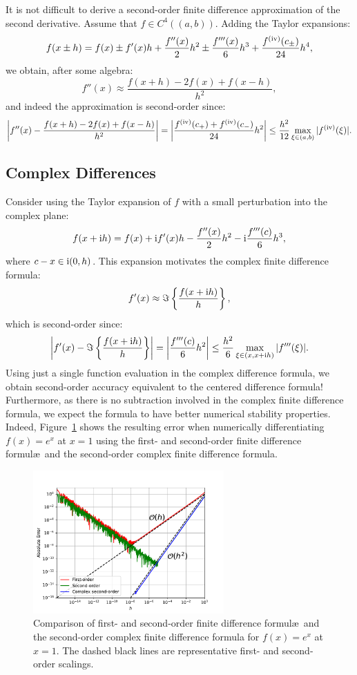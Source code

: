 It is not difficult to derive a second-order finite difference approximation of the second derivative. Assume that $f\in C^4((a,b))$. Adding the Taylor expansions:
\[
f(x\pm h) = f(x) \pm f'(x)h + \dfrac{f''(x)}{2}h^2 \pm \dfrac{f'''(x)}{6}h^3 + \dfrac{f^{({\rm iv})}(c_\pm)}{24}h^4,
\]
we obtain, after some algebra:
\[
f''(x) \approx \dfrac{f(x+h)-2f(x) + f(x-h)}{h^2},
\]
and indeed the approximation is second-order since:
\[
\left|f''(x) - \dfrac{f(x+h)-2f(x) + f(x-h)}{h^2}\right| = \left|\dfrac{f^{({\rm iv})}(c_+) + f^{({\rm iv})}(c_-)}{24}h^2\right| \le \dfrac{h^2}{12}\max_{\xi\in(a,b)}|f^{({\rm iv})}(\xi)|.
\]

\subsection{Complex Differences}

Consider using the Taylor expansion of $f$ with a small perturbation into the complex plane:
\[
f(x+{\rm i} h) = f(x) + {\rm i} f'(x)h - \dfrac{f''(x)}{2}h^2 - {\rm i}\dfrac{f'''(c)}{6}h^3,
\]
where $c-x\in{\rm i}(0,h)$. This expansion motivates the complex finite difference formula:
\[
f'(x) \approx \Im\left\{\dfrac{f(x+{\rm i} h)}{h}\right\},
\]
which is second-order since:
\[
\left|f'(x) - \Im\left\{\dfrac{f(x+{\rm i} h)}{h}\right\}\right| = \left|\dfrac{f'''(c)}{6}h^2\right| \le \dfrac{h^2}{6}\max_{\xi\in(x,x+{\rm i} h)}|f'''(\xi)|.
\]
Using just a single function evaluation in the complex difference formula, we obtain second-order accuracy equivalent to the centered difference formula! Furthermore, as there is no subtraction involved in the complex finite difference formula, we expect the formula to have better numerical stability properties. Indeed, Figure~\ref{figure:FiniteDifferences} shows the resulting error when numerically differentiating $f(x) = e^x$ at $x=1$ using the first- and second-order finite difference formul\ae~and the second-order complex finite difference formula.

\begin{figure}[htbp]
\begin{center}
\includegraphics[width=0.65\textwidth]{finitedifferences}
\caption{Comparison of first- and second-order finite difference formul\ae~and the second-order complex finite difference formula for $f(x)=e^x$ at $x=1$. The dashed black lines are representative first- and second-order scalings.}
\label{figure:FiniteDifferences}
\end{center}
\end{figure}

